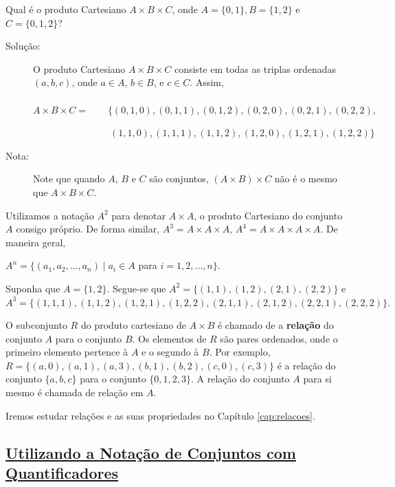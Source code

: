 \begin{exmp}
\label{exem315}
Qual é o produto Cartesiano $A \times B \times C$, onde $A = \{0,1\}, B=\{1,2\}$
e $C = \{0,1,2\}$?
\begin{description}
\item[Solução:]O produto Cartesiano $A\times B\times C$ consiste em todas as
triplas ordenadas $(a,b,c)$, onde $a \in A$, $b \in B$, e $c \in C$. Assim,
\\ \\
{$A\times B\times C=\qquad\{(0,1,0), (0,1,1), (0,1,2), (0,2,0), (0,2,1),
(0,2,2),$}

{$\qquad\qquad\qquad\qquad(1,1,0), (1,1,1), (1,1,2), (1,2,0), (1,2,1),
(1,2,2)\}$} \\

\item[Nota:] Note que quando $A$, $B$ e $C$ são conjuntos, $(A \times B) \times
C$ não é o mesmo que $A \times B \times C$.
\end{description}
\end{exmp}

Utilizamos a notação $A^2$ para denotar $A \times A$, o produto Cartesiano do
conjunto $A$ consigo próprio. De forma similar, $A^3 = A \times A \times A$,
$A^4 = A \times A \times A \times A$. De maneira geral,

$A^n =\{(a_1, a_2, \ldots, a_n) \mid a_i \in A$ para $i = 1,2,\ldots,n\}.$

\begin{exmp}
\label{exem316}
Suponha que $A = \{1,2\}$. Segue-se que $A^2 = \{(1,1),(1,2),(2,1),(2,2)\}$ e
$A^3=\{(1,1,1),(1,1,2),(1,2,1),(1,2,2),(2,1,1),(2,1,2),(2,2,1),(2,2,2)\}.$
\end{exmp}

O subconjunto $R$ do produto cartesiano de $A \times B$ é chamado de a
\textbf{relação} do conjunto $A$ para o conjunto $B$. Os elementos de $R$ são
pares ordenados, onde o primeiro elemento pertence à $A$ e o segundo à $B$. Por
exemplo, $R=\{(a,0),(a,1),(a,3),(b,1),(b,2),(c,0),(c,3)\}$ é a relação do
conjunto $\{a,b,c\}$ para o conjunto $\{0,1,2,3\}$. A relação do conjunto $A$
para si mesmo é chamada de relação em $A$.

Iremos estudar relações e as suas propriedades no Capítulo \ref{cap:relacoes}.

\subsection*{\underline{Utilizando a Notação de Conjuntos com Quantificadores}}

